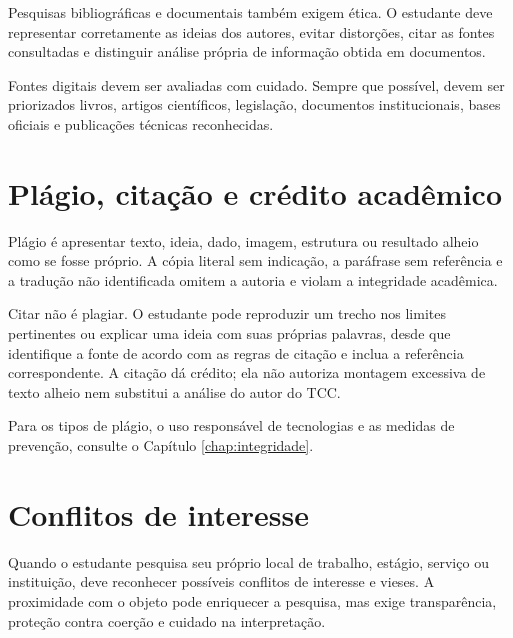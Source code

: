 Pesquisas bibliográficas e documentais também exigem ética. O estudante deve representar corretamente as ideias dos autores, evitar distorções, citar as fontes consultadas e distinguir análise própria de informação obtida em documentos.

Fontes digitais devem ser avaliadas com cuidado. Sempre que possível, devem ser priorizados livros, artigos científicos, legislação, documentos institucionais, bases oficiais e publicações técnicas reconhecidas.

\section{Plágio, citação e crédito acadêmico}

Plágio é apresentar texto, ideia, dado, imagem, estrutura ou resultado alheio como se fosse próprio. A cópia literal sem indicação, a paráfrase sem referência e a tradução não identificada omitem a autoria e violam a integridade acadêmica.

Citar não é plagiar. O estudante pode reproduzir um trecho nos limites pertinentes ou explicar uma ideia com suas próprias palavras, desde que identifique a fonte de acordo com as regras de citação e inclua a referência correspondente. A citação dá crédito; ela não autoriza montagem excessiva de texto alheio nem substitui a análise do autor do TCC.


Para os tipos de plágio, o uso responsável de tecnologias e as medidas de prevenção, consulte o Capítulo \ref{chap:integridade}.

\section{Conflitos de interesse}

Quando o estudante pesquisa seu próprio local de trabalho, estágio, serviço ou instituição, deve reconhecer possíveis conflitos de interesse e vieses. A proximidade com o objeto pode enriquecer a pesquisa, mas exige transparência, proteção contra coerção e cuidado na interpretação.


